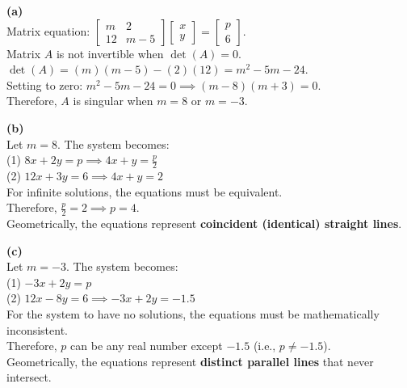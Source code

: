 \begin{solution}
\textbf{(a)} \\
Matrix equation: $\begin{bmatrix} m & 2 \\ 12 & m-5 \end{bmatrix} \begin{bmatrix} x \\ y \end{bmatrix} = \begin{bmatrix} p \\ 6 \end{bmatrix}$. \\
Matrix $A$ is not invertible when $\det(A) = 0$. \\
$\det(A) = (m)(m-5) - (2)(12) = m^2 - 5m - 24$. \\
Setting to zero: $m^2 - 5m - 24 = 0 \implies (m-8)(m+3) = 0$. \\
Therefore, $A$ is singular when $m = 8$ or $m = -3$.

\medskip
\textbf{(b)} \\
Let $m = 8$. The system becomes: \\
(1) $8x + 2y = p \implies 4x + y = \frac{p}{2}$ \\
(2) $12x + 3y = 6 \implies 4x + y = 2$ \\
For infinite solutions, the equations must be equivalent. \\
Therefore, $\frac{p}{2} = 2 \implies p = 4$. \\
Geometrically, the equations represent \textbf{coincident (identical) straight lines}.

\medskip
\textbf{(c)} \\
Let $m = -3$. The system becomes: \\
(1) $-3x + 2y = p$ \\
(2) $12x - 8y = 6 \implies -3x + 2y = -1.5$ \\
For the system to have no solutions, the equations must be mathematically inconsistent. \\
Therefore, $p$ can be any real number except $-1.5$ (i.e., $p \neq -1.5$). \\
Geometrically, the equations represent \textbf{distinct parallel lines} that never intersect.


\end{solution}
